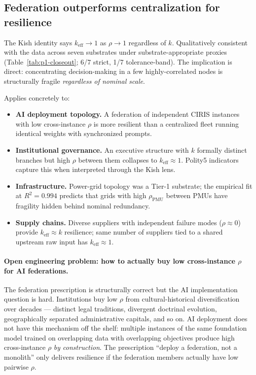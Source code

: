 \documentclass[11pt,a4paper]{article}
\begin{document}
\subsection{Federation outperforms centralization for resilience}
The Kish identity says $k_{\text{eff}} \to 1$ as $\rho \to 1$ regardless of $k$. Qualitatively consistent with the data across seven substrates under substrate-appropriate proxies (Table~\ref{tab:p1-closeout}; 6/7 strict, 1/7 tolerance-band). The implication is direct: concentrating decision-making in a few highly-correlated nodes is structurally fragile \emph{regardless of nominal scale}.

Applies concretely to:
\begin{itemize}
  \item \textbf{AI deployment topology.} A federation of independent CIRIS instances with low cross-instance $\rho$ is more resilient than a centralized fleet running identical weights with synchronized prompts.
  \item \textbf{Institutional governance.} An executive structure with $k$ formally distinct branches but high $\rho$ between them collapses to $k_{\text{eff}} \approx 1$. Polity5 indicators capture this when interpreted through the Kish lens.
  \item \textbf{Infrastructure.} Power-grid topology was a Tier-1 substrate; the empirical fit at $R^2 = 0.994$ predicts that grids with high $\rho_{\text{PMU}}$ between PMUs have fragility hidden behind nominal redundancy.
  \item \textbf{Supply chains.} Diverse suppliers with independent failure modes ($\rho \approx 0$) provide $k_{\text{eff}} \approx k$ resilience; same number of suppliers tied to a shared upstream raw input has $k_{\text{eff}} \approx 1$.
\end{itemize}

\paragraph{Open engineering problem: how to actually buy low cross-instance $\rho$ for AI federations.} The federation prescription is structurally correct but the AI implementation question is hard. Institutions buy low $\rho$ from cultural-historical diversification over decades --- distinct legal traditions, divergent doctrinal evolution, geographically separated administrative capitals, and so on. AI deployment does not have this mechanism off the shelf: multiple instances of the same foundation model trained on overlapping data with overlapping objectives produce high cross-instance $\rho$ \emph{by construction}. The prescription ``deploy a federation, not a monolith'' only delivers resilience if the federation members actually have low pairwise $\rho$.
\end{document}
